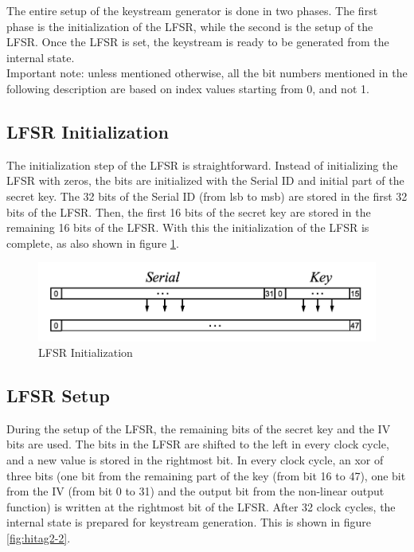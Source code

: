 \documentclass[11pt,a4paper]{article}
\begin{document}
The entire setup of the keystream generator is done in two phases. The first phase is the initialization of the LFSR, while the second is the setup of the LFSR. Once the LFSR is set, the keystream is ready to be generated from the internal state.\\ Important note: unless mentioned otherwise, all the bit numbers mentioned in the following description are based on index values starting from 0, and not 1. 

\subsection{LFSR Initialization}

The initialization step of the LFSR is straightforward. Instead of initializing the LFSR with zeros, the bits are initialized with the Serial ID and initial part of the secret key. The 32 bits of the Serial ID (from lsb to msb) are stored in the first 32 bits of the LFSR. Then, the first 16 bits of the secret key are stored in the remaining 16 bits of the LFSR. With this the initialization of the LFSR is complete, as also shown in figure \ref{fig:hitag2-1}. 

\begin{figure}[h]
	\centering
		\includegraphics[width=6in]{./hitag2-1.PNG}
	\caption{LFSR Initialization}	
	\label{fig:hitag2-1}
\end{figure}

\subsection{LFSR Setup}

During the setup of the LFSR, the remaining bits of the secret key and the IV bits are used. The bits in the LFSR are shifted to the left in every clock cycle, and a new value is stored in the rightmost bit. In every clock cycle, an xor of three bits (one bit from the remaining part of the key (from bit 16 to 47), one bit from the IV (from bit 0 to 31) and the output bit from the non-linear output function) is written at the rightmost bit of the LFSR. After 32 clock cycles, the internal state is prepared for keystream generation. This is shown in figure \ref{fig:hitag2-2}.
\end{document}
